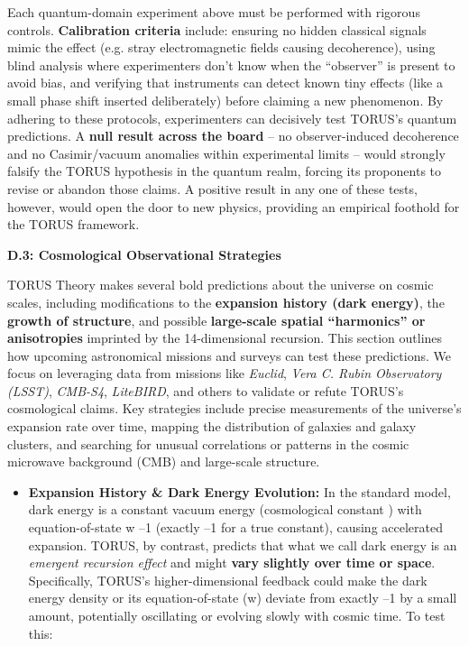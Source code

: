\documentclass[
]{article}
\begin{document}
{Each quantum-domain experiment above must be performed with rigorous
controls. \textbf{Calibration criteria} include: ensuring no hidden
classical signals mimic the effect (e.g. stray electromagnetic fields
causing decoherence), using blind analysis where experimenters don't
know when the ``observer'' is present to avoid bias, and verifying that
instruments can detect known tiny effects (like a small phase shift
inserted deliberately) before claiming a new phenomenon. By adhering to
these protocols, experimenters can decisively test TORUS's quantum
predictions. A \textbf{null result across the board} -- no
observer-induced decoherence and no Casimir/vacuum anomalies within
experimental limits -- would strongly falsify the TORUS hypothesis in
the quantum realm, forcing its proponents to revise or abandon those
claims. A positive result in any one of these tests, however, would open
the door to new physics, providing an empirical foothold for the TORUS
framework.

\textbf{D.3: Cosmological Observational Strategies}

TORUS Theory makes several bold predictions about the universe on cosmic
scales, including modifications to the \textbf{expansion history (dark
energy)}, the \textbf{growth of structure}, and possible
\textbf{large-scale spatial ``harmonics'' or anisotropies} imprinted by
the 14-dimensional recursion. This section outlines how upcoming
astronomical missions and surveys can test these predictions. We focus
on leveraging data from missions like \emph{Euclid}, \emph{Vera C. Rubin
Observatory (LSST)}, \emph{CMB-S4}, \emph{LiteBIRD}, and others to
validate or refute TORUS's cosmological claims. Key strategies include
precise measurements of the universe's expansion rate over time, mapping
the distribution of galaxies and galaxy clusters, and searching for
unusual correlations or patterns in the cosmic microwave background
(CMB) and large-scale structure.

\begin{itemize}
\item
  \textbf{Expansion History \& Dark Energy Evolution:} In the standard
  \LambdaCDM model, dark energy is a constant vacuum energy (cosmological
  constant \Lambda) with equation-of-state w \approx --1 (exactly --1 for a true
  constant), causing accelerated expansion. TORUS, by contrast, predicts
  that what we call dark energy is an \emph{emergent recursion effect}
  and might \textbf{vary slightly over time or space}\hspace{0pt}.
  Specifically, TORUS's higher-dimensional feedback could make the dark
  energy density or its equation-of-state (w) deviate from exactly --1
  by a small amount, potentially oscillating or evolving slowly with
  cosmic time\hspace{0pt}. To test this:


\end{itemize}}
\end{document}

